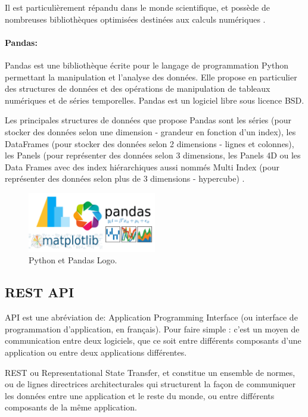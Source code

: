 Il est particulièrement répandu dans le monde scientifique, et possède de nombreuses bibliothèques optimisées destinées aux calculs numériques \cite{PythonLangageWikipedia}.
\renewcommand{\labelitemi}{$\bullet$}

\paragraph{Pandas:}
Pandas \cite{PandasPythonData} est une bibliothèque écrite pour le langage de programmation Python permettant la manipulation et l'analyse des données. Elle propose en particulier des structures de données et des opérations de manipulation de tableaux numériques et de séries temporelles. Pandas est un logiciel libre sous licence BSD.

Les principales structures de données que propose Pandas sont les séries (pour stocker des données selon une dimension - grandeur en fonction d'un index), les DataFrames (pour stocker des données selon 2 dimensions - lignes et colonnes), les Panels (pour représenter des données selon 3 dimensions, les Panels 4D ou les Data Frames avec des index hiérarchiques aussi nommés Multi Index (pour représenter des données selon plus de 3 dimensions - hypercube) \cite{Pandas2020}.


\begin{figure}[h!]
    \center
    \includegraphics[width=0.50\textwidth]{Images/chapter3/python_pandas.png}
    \caption{Python et Pandas Logo.}
    \label{fig:Technologies}
\end{figure}

\subsection{REST API}
API est une abréviation de:  Application Programming Interface (ou interface de programmation d’application, en français). Pour faire simple : c’est un moyen de communication entre deux logiciels, que ce soit entre différents composants d’une application ou entre deux applications différentes.

REST ou Representational State Transfer, et constitue un ensemble de normes, ou de lignes directrices architecturales qui structurent la façon de communiquer les données entre une application et le reste du monde, ou entre différents composants de la même application.

